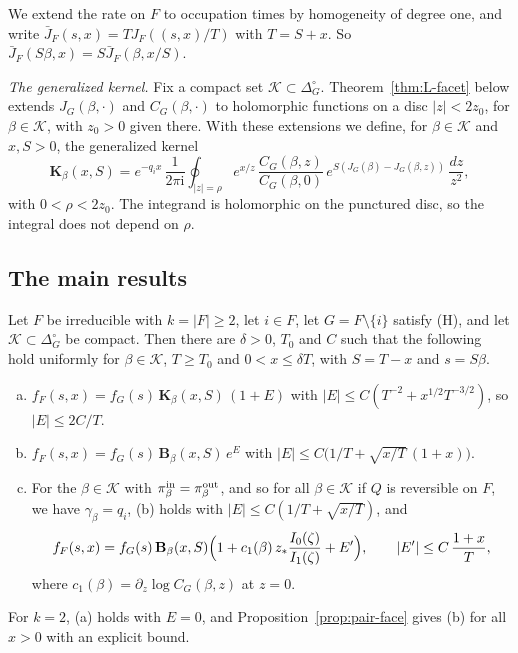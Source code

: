 We extend the rate on $F$ to occupation times by homogeneity of degree one, and write
$\bar J_F(s,x)=TJ_F((s,x)/T)$ with $T=S+x$. So $\bar J_F(S\beta,x)=S\bar J_F(\beta,x/S)$.

\emph{The generalized kernel.} Fix a compact set $\mathcal K\subset\Delta_G^\circ$.
Theorem~\ref{thm:L-facet} below extends $J_G(\beta,\cdot)$ and $C_G(\beta,\cdot)$ to holomorphic
functions on a disc $|z|<2z_0$, for $\beta\in\mathcal K$, with $z_0>0$ given there. With these extensions we define, for
$\beta\in\mathcal K$ and $x,S>0$, the generalized kernel
\[
\mathbf K_\beta(x,S)=e^{-q_ix}\,\frac1{2\pi\mathrm i}\oint_{|z|=\rho}e^{x/z}\,\frac{C_G(\beta,z)}{C_G(\beta,0)}\,e^{S(J_G(\beta)-J_G(\beta,z))}\,\frac{dz}{z^2},
\]
with $0<\rho<2z_0$. The integrand is holomorphic on the punctured disc, so the integral does not
depend on $\rho$.

\subsection{The main results}\label{sec:layer-main}

\begin{theorem}\label{thm:layer}
Let $F$ be irreducible with $k=|F|\ge2$, let $i\in F$, let $G=F\setminus\{i\}$ satisfy
\textup{(H)}, and let $\mathcal K\subset\Delta_G^\circ$ be compact. Then there
are $\delta>0$, $T_0$ and $C$ such that the following hold uniformly for $\beta\in\mathcal K$, $T\ge T_0$ and
$0<x\le\delta T$, with $S=T-x$ and $s=S\beta$.
\begin{enumerate}[(a)]
\item $f_F(s,x)=f_G(s)\,\mathbf K_\beta(x,S)\,(1+E)$ with
$|E|\le C(T^{-2}+x^{1/2}T^{-3/2})$, so $|E|\le2C/T$.
\item $f_F(s,x)=f_G(s)\,\mathbf B_\beta(x,S)\,e^{E}$ with $|E|\le C\bigl(1/T+\sqrt{x/T}\,(1+x)\bigr)$.
\item For the $\beta\in\mathcal K$ with $\pi^{\rm in}_\beta=\pi^{\rm out}_\beta$, and so for all
$\beta\in\mathcal K$ if $Q$ is reversible on $F$, we have $\gamma_\beta=q_i$, (b) holds with
$|E|\le C(1/T+\sqrt{x/T})$, and
\[
f_F(s,x)=f_G(s)\,\mathbf B_\beta(x,S)\Bigl(1+c_1(\beta)\,z_*\frac{I_0(\zeta)}{I_1(\zeta)}+E'\Bigr),\qquad|E'|\le C\,\frac{1+x}T ,
\]
where $c_1(\beta)=\partial_z\log C_G(\beta,z)$ at $z=0$.
\end{enumerate}
For $k=2$, (a) holds with $E=0$, and Proposition~\ref{prop:pair-face} gives (b) for all
$x>0$ with an explicit bound.
\end{theorem}

